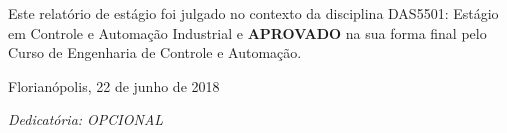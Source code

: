 \documentclass[
	12pt,				%
	openright,			%
	oneside,			%
	a4paper,			%
	english,			%
	brazil				%
	]{abntex2}
\begin{document}
%
% 
%
\makeatletter
\begin{folhadeaprovacao}

  \begin{center}
    {\ABNTEXchapterfont\large\imprimirautor}

    \vspace*{\fill}\vspace*{\fill}
    \begin{center}
      \ABNTEXchapterfont\bfseries\Large\imprimirtitulo
    \end{center}
    \vspace*{\fill}
    
    Este relatório de estágio foi julgado no contexto da disciplina DAS5501: Estágio em Controle e Automação Industrial e \textbf{APROVADO} na sua forma final pelo Curso de Engenharia de Controle e Automação.
    
    \vspace*{\fill}
    
    Florianópolis, 22 de junho de 2018
  \end{center}
  
   
      
\makeatother
   
        
\end{folhadeaprovacao}

\begin{dedicatoria}
   \vspace*{\fill}
   \centering
   \noindent
   \textit{Dedicatória: OPCIONAL} \vspace*{\fill}
\end{dedicatoria}
\end{document}
